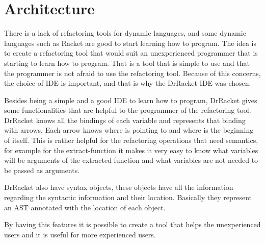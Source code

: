 
% 
% 

\section{Architecture}

There is a lack of refactoring tools for dynamic languages, and some dynamic languages such as Racket are good to start learning how to program.
The idea is to create a refactoring tool that would suit an unexperienced programmer that is starting to learn how to program. That is a tool that is simple to use and that the programmer is not afraid to use the refactoring tool.
Because of this concerns, the choice of IDE is important, and that is why the DrRacket IDE was chosen.


Besides being a simple and a good IDE to learn how to program, DrRacket gives some functionalities that are helpful to the programmer of the refactoring tool. DrRacket knows all the bindings of each variable and represents that binding with arrows. Each arrow knows where is pointing to and where is the beginning of itself. This is rather helpful for the refactoring operations that need semantics, for example for the extract-function it makes it very easy to know what variables will be arguments of the extracted function and what variables are not needed to be passed as arguments.

DrRacket also have syntax objects, these objects have all the information regarding the syntactic information and their location. Basically they represent an AST annotated with the location of each object.

By having this features it is possible to create a tool that helps the unexperienced users and it is useful for more experienced users.

